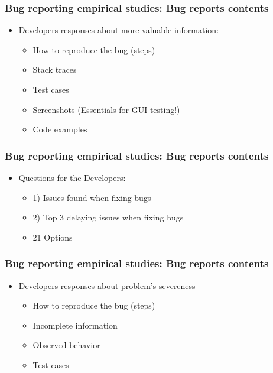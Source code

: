 \documentclass{beamer}
\begin{document}

\begin{frame}
 \frametitle{Bug reporting empirical studies: Bug reports contents}
 \begin{itemize}
    \item Developers responses about more valuable information: 
        \begin{itemize}
        \item How to reproduce the bug (steps)
        \item Stack traces 
        \item Test cases
        \item Screenshots (Essentials for GUI testing!)
        \item Code examples
        \end{itemize}
 \end{itemize}
\end{frame}


\begin{frame}
 \frametitle{Bug reporting empirical studies: Bug reports contents}
 \begin{itemize}
    \item Questions for the Developers:
      \begin{itemize}
      \item 1) Issues found when fixing bugs
      \item 2) Top 3 delaying issues when fixing bugs
      \item 21 Options
      \end{itemize}
 \end{itemize}
\end{frame}


\begin{frame}
 \frametitle{Bug reporting empirical studies: Bug reports contents}
 \begin{itemize}
    \item Developers responses about problem's severeness
        \begin{itemize}
        \item How to reproduce the bug (steps)
        \item Incomplete information
        \item Observed behavior
        \item Test cases
        \end{itemize}
 \end{itemize}
\end{frame}
\end{document}

